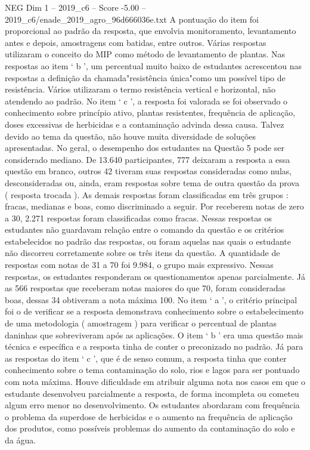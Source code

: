 \begin{textsample}{NEG Dim 1 – 2019\_c6 – Score -5.00 – 2019\_c6/enade\_2019\_agro\_96d666036e.txt}
A pontuação do item foi proporcional ao padrão da resposta, que envolvia monitoramento, levantamento antes e depois, amostragens com batidas, entre outros.
Várias respostas utilizaram o conceito do MIP como método de levantamento de plantas.
Nas respostas ao item ‘ b ’, um percentual muito baixo de estudantes acrescentou nas respostas a definição da chamada"resistência única"como um possível tipo de resistência.
Vários utilizaram o termo resistência vertical e horizontal, não atendendo ao padrão.
No item ‘ c ’, a resposta foi valorada se foi observado o conhecimento sobre princípio ativo, plantas resistentes, frequência de aplicação, doses excessivas de herbicidas e a contaminação advinda dessa causa.
Talvez devido ao tema da questão, não houve muita diversidade de soluções apresentadas.
No geral, o desempenho dos estudantes na Questão 5 pode ser considerado mediano.
De 13.640 participantes, 777 deixaram a resposta a essa questão em branco, outros 42 tiveram suas respostas consideradas como nulas, desconsideradas ou, ainda, eram respostas sobre tema de outra questão da prova ( resposta trocada ).
As demais respostas foram classificadas em três grupos : fracas, medianas e boas, como discriminado a seguir.
Por receberem notas de zero a 30, 2.271 respostas foram classificadas como fracas.
Nessas respostas os estudantes não guardavam relação entre o comando da questão e os critérios estabelecidos no padrão das respostas, ou foram aquelas nas quais o estudante não discorreu corretamente sobre os três itens da questão.
A quantidade de respostas com notas de 31 a 70 foi 9.984, o grupo mais expressivo.
Nessas respostas, os estudantes responderam os questionamentos apenas parcialmente.
Já as 566 respostas que receberam notas maiores do que 70, foram consideradas boas, dessas 34 obtiveram a nota máxima 100.
No item ‘ a ’, o critério principal foi o de verificar se a resposta demonstrava conhecimento sobre o estabelecimento de uma metodologia ( amostragem ) para verificar o percentual de plantas daninhas que sobreviveram após as aplicações.
O item ‘ b ’ era uma questão mais técnica e específica e a resposta tinha de conter o preconizado no padrão.
Já para as respostas do item ‘ c ’, que é de senso comum, a resposta tinha que conter conhecimento sobre o tema contaminação do solo, rios e lagos para ser pontuado com nota máxima.
Houve dificuldade em atribuir alguma nota nos casos em que o estudante desenvolveu parcialmente a resposta, de forma incompleta ou cometeu algum erro menor no desenvolvimento.
Os estudantes abordaram com frequência o problema da superdose de herbicidas e o aumento na frequência de aplicação dos produtos, como possíveis problemas do aumento da contaminação do solo e da água.

\end{textsample}
